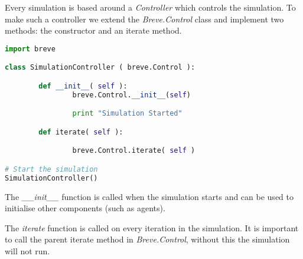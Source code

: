 
Every simulation is based around a \textit{Controller} which controls the simulation. To make such a controller we extend the \textit{Breve.Control} class and implement two methods: the constructor and an iterate method.

\begin{lstlisting}[language=Python]
import breve

class SimulationController ( breve.Control ):

        def __init__( self ):
                breve.Control.__init__(self)

                print "Simulation Started"

        def iterate( self ):

                breve.Control.iterate( self )

# Start the simulation
SimulationController()
\end{lstlisting}




The \textit{\_\_init\_\_} function is called when the simulation starts and can be used to initialise other components (such as agents). 

The \textit{iterate} function is called on every iteration in the simulation. It is important to call the parent iterate method in \textit{Breve.Control}, without this the simulation will not run.

